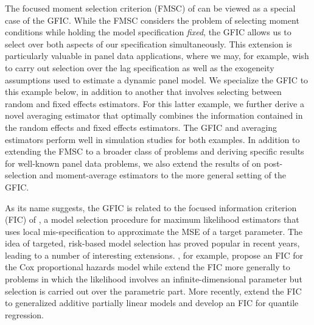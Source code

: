 The focused moment selection criterion (FMSC) of \cite{DiTraglia2012} can be viewed as a special case of the GFIC. 
While the FMSC considers the problem of selecting moment conditions while holding the model specification \emph{fixed}, the GFIC allows us to select over both aspects of our specification simultaneously.
This extension is particularly valuable in panel data applications, where we may, for example, wish to carry out selection over the lag specification as well as the exogeneity assumptions used to estimate a dynamic panel model.
We specialize the GFIC to this example below, in addition to another that involves selecting between random and fixed effects estimators.
For this latter example, we further derive a novel averaging estimator that optimally combines the information contained in the random effects and fixed effects estimators.
The GFIC and averaging estimators perform well in simulation studies for both examples.
In addition to extending the FMSC to a broader class of problems and deriving specific results for well-known panel data problems, we also extend the results of \cite{DiTraglia2012} on post-selection and moment-average estimators to the more general setting of the GFIC.  

As its name suggests, the GFIC is related to the focused information criterion (FIC) of \cite{ClaeskensHjort2003}, a model selection procedure for maximum likelihood estimators that uses local mis-specification to approximate the MSE of a target parameter. 
The idea of targeted, risk-based model selection has proved popular in recent years, leading to a number of interesting extensions. 
\cite{HjortClaeskens2006}, for example, propose an FIC for the Cox proportional hazards model while \cite{ClaeskensCarroll} extend the FIC more generally to problems in which the likelihood involves an infinite-dimensional parameter but selection is carried out over the parametric part. 
More recently, \cite{ZhangLiang} extend the FIC to generalized additive partially linear models and \cite{BehlClaeskensDette} develop an FIC for quantile regression.

